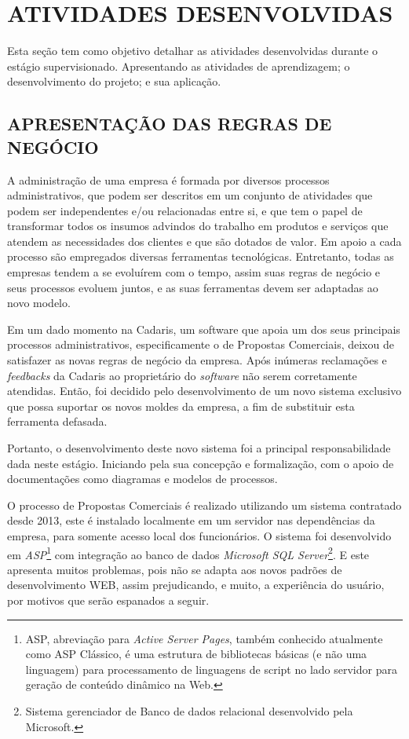 \documentclass[
  12pt,				%
  openany,
  oneside,
  a4paper,			%
  english,			%
  brazil
]{article}
\numberwithin{figure}{section}
\numberwithin{table}{section}
\begin{document}
\clearpage
\section{ATIVIDADES DESENVOLVIDAS}


Esta seção tem como objetivo detalhar as atividades desenvolvidas durante o estágio supervisionado. Apresentando as atividades de aprendizagem; o desenvolvimento do projeto; e sua aplicação.


\subsection{APRESENTAÇÃO DAS REGRAS DE NEGÓCIO}

A administração de uma empresa é formada por diversos processos administrativos, que podem ser descritos em um conjunto de atividades que podem ser independentes e/ou relacionadas entre si, e que tem o papel de transformar todos os insumos advindos do trabalho em produtos e serviços que atendem as necessidades dos clientes e que são dotados de valor. Em apoio a cada processo são empregados diversas ferramentas tecnológicas. Entretanto, todas as empresas tendem a se evoluírem com o tempo, assim suas regras de negócio e seus processos evoluem juntos, e as suas ferramentas devem ser adaptadas ao novo modelo.

Em um dado momento na Cadaris, um software que apoia um dos seus principais processos administrativos, especificamente o de Propostas Comerciais, deixou de satisfazer as novas regras de negócio da empresa. Após inúmeras reclamações e \textit{feedbacks} da Cadaris ao proprietário do \textit{software} não serem corretamente atendidas. Então, foi decidido pelo desenvolvimento de um novo sistema exclusivo que possa suportar os novos moldes da empresa, a fim de substituir esta ferramenta defasada.

Portanto, o desenvolvimento deste novo sistema foi a principal responsabilidade dada neste estágio. Iniciando pela sua concepção e formalização, com o apoio de documentações como diagramas e modelos de processos.

O processo de Propostas Comerciais é realizado utilizando um sistema contratado desde 2013, este é instalado localmente em um servidor nas dependências da empresa, para somente acesso local dos funcionários. O sistema foi desenvolvido em \textit{ASP}\footnote{ASP, abreviação para \textit{Active Server Pages}, também conhecido atualmente como ASP Clássico, é uma estrutura de bibliotecas básicas (e não uma linguagem) para processamento de linguagens de script no lado servidor para geração de conteúdo dinâmico na Web.} com integração ao banco de dados \textit{Microsoft SQL Server}\footnote{Sistema gerenciador de Banco de dados relacional desenvolvido pela Microsoft.}. E este apresenta muitos problemas, pois não se adapta aos novos padrões de desenvolvimento WEB, assim prejudicando, e muito, a experiência do usuário, por motivos que serão espanados a seguir.
\end{document}
